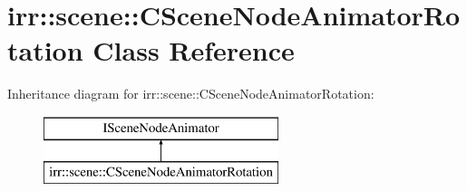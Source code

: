 \hypertarget{classirr_1_1scene_1_1_c_scene_node_animator_rotation}{\section{irr\-:\-:scene\-:\-:C\-Scene\-Node\-Animator\-Rotation Class Reference}
\label{classirr_1_1scene_1_1_c_scene_node_animator_rotation}
}
Inheritance diagram for irr\-:\-:scene\-:\-:C\-Scene\-Node\-Animator\-Rotation\-:\begin{figure}[H]
\begin{center}
\leavevmode
\includegraphics[height=2.000000cm]{classirr_1_1scene_1_1_c_scene_node_animator_rotation}
\end{center}
\end{figure}
